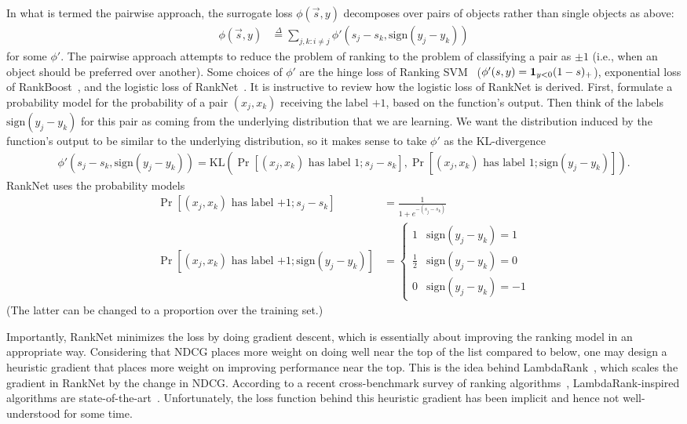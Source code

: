 In what is termed the pairwise approach, the surrogate loss
$\phi(\vec{s}, y)$ decomposes over pairs of objects rather than single objects
as above:
\begin{align*}
  \phi(\vec{s}, y)
  &\stackrel{\Delta}{=}
  \sum_{j,k : i \neq j} \phi'(s_j - s_k, \text{sign}(y_j - y_k)) 
\end{align*}
for some $\phi'$.
The pairwise approach attempts to reduce the problem of
ranking to the problem of classifying a pair as $\pm 1$ (i.e.,
when an object should be preferred over another). Some choices of $\phi'$
are the hinge loss of Ranking SVM~\cite{ranksvm}
($\phi'(s, y) = {\mathbf 1}_{y < 0}(1 - s)_+$),
exponential loss of RankBoost~\cite{rankboost},
and the logistic loss of RankNet~\cite{}.
It is instructive to review how the logistic loss of RankNet is derived.
First, formulate a probability model for the probability
of a pair $(x_j, x_k)$ receiving the label $+1$, based on the function's
output. Then think of the labels $\text{sign}(y_j - y_k)$
for this pair as coming from the underlying distribution that we are learning.
We want the distribution induced by the function's output to be similar to the
underlying distribution, so it makes sense to take $\phi'$ as the KL-divergence
\begin{align*}
  \phi'(s_j - s_k, \text{sign}(y_j - y_k))
  = \text{KL}(\Pr[\text{$(x_j, x_k)$ has label $1$} ; s_j - s_k], \Pr[\text{$(x_j, x_k)$ has label $1$} ; \text{sign}(y_j - y_k)]).
\end{align*}
RankNet uses the probability models
\begin{align*}
  \Pr[\text{$(x_j, x_k)$ has label $+1$}; s_j - s_k] &= \frac{1}{1 + e^{-(s_j - s_k)}} \\
  \Pr[\text{$(x_j, x_k)$ has label $+1$} ; \text{sign}(y_j - y_k)] &=
  \begin{cases}
    1 & \text{sign}(y_j - y_k) = 1 \\
    \frac{1}{2} & \text{sign}(y_j - y_k) = 0 \\
    0 & \text{sign}(y_j - y_k) = -1
  \end{cases}
\end{align*}
(The latter can be changed to a proportion over the training set.)

Importantly, RankNet minimizes the loss by doing gradient descent, which is
essentially about improving the ranking model in an appropriate way. Considering
that NDCG places more weight on doing well near the top of the list compared to
below, one may design a heuristic gradient that places more weight on improving
performance near the top. This is the idea behind LambdaRank~\cite{lambda-rank},
which scales the gradient in RankNet by the change in NDCG. 
According to a recent cross-benchmark survey of ranking
algorithms~\cite{cross-benchmark}, LambdaRank-inspired algorithms are
state-of-the-art~\cite{lambdaneural, lambdamart}.
Unfortunately, the loss function behind this heuristic
gradient has been implicit and hence not well-understood for some time.

